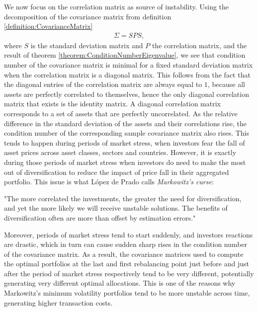     	We now focus on the correlation matrix as source of instability. Using the decomposition of the covariance matrix from definition \ref{definition:CovarianceMatrix}
    	\begin{align*}
    	    \Sigma = S P S,
    	\end{align*}
    	where $S$ is the standard deviation matrix and $P$ the correlation matrix, and the result of theorem \ref{theorem:ConditionNumberEigenvalue}, we see that condition number of the covariance matrix is minimal for a fixed standard deviation matrix when the correlation matrix is a diagonal matrix. This follows from the fact that the diagonal entries of the correlation matrix are always equal to $1$, because all assets are perfectly correlated to themselves, hence the only diagonal correlation matrix that exists is the identity matrix. A diagonal correlation matrix corresponds to a set of assets that are perfectly uncorrelated. As the relative difference in the standard deviation of the assets and their correlations rise, the condition number of the corresponding sample covariance matrix also rises. This tends to happen during periods of market stress, when investors fear the fall of asset prices across asset classes, sectors and countries. However, it is exactly during those periods of market stress when investors do need to make the most out of diversification to reduce the impact of price fall in their aggregated portfolio. This issue is what López de Prado calls \textit{Markowitz's curse}:
    	
    	\begin{displayquote}
    	    "The more correlated the investments, the greater the need for diversification, and yet the more likely we will receive unstable solutions. The benefits of diversification often are more than offset by estimation errors."
        \end{displayquote}
        
        Moreover, periods of market stress tend to start suddenly, and investors reactions are drastic, which in turn can cause sudden sharp rises in the condition number of the covariance matrix. As a result, the covariance matrices used to compute the optimal portfolios at the last and first rebalancing point just before and just after the period of market stress respectively tend to be very different, potentially generating very different optimal allocations. This is one of the reasons why Markowitz's minimum volatility portfolios tend to be more unstable across time, generating higher transaction costs.
        
